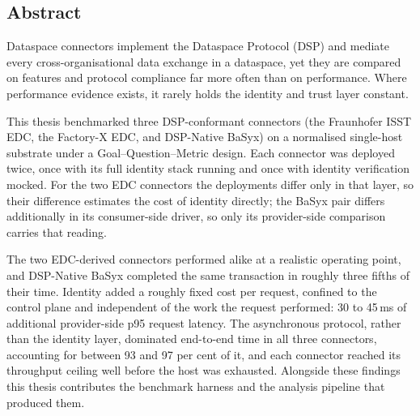 \thispagestyle{empty}

\subsection*{Abstract}

Dataspace connectors implement the Dataspace Protocol (DSP) and mediate every cross-organisational data exchange in a dataspace, yet they are compared on features and protocol compliance far more often than on performance. Where performance evidence exists, it rarely holds the identity and trust layer constant.

This thesis benchmarked three DSP-conformant connectors (the Fraunhofer ISST EDC, the Factory-X EDC, and DSP-Native BaSyx) on a normalised single-host substrate under a Goal--Question--Metric design. Each connector was deployed twice, once with its full identity stack running and once with identity verification mocked. For the two EDC connectors the deployments differ only in that layer, so their difference estimates the cost of identity directly; the BaSyx pair differs additionally in its consumer-side driver, so only its provider-side comparison carries that reading.

The two EDC-derived connectors performed alike at a realistic operating point, and DSP-Native BaSyx completed the same transaction in roughly three fifths of their time. Identity added a roughly fixed cost per request, confined to the control plane and independent of the work the request performed: 30 to 45\,ms of additional provider-side p95 request latency. The asynchronous protocol, rather than the identity layer, dominated end-to-end time in all three connectors, accounting for between 93 and 97 per cent of it, and each connector reached its throughput ceiling well before the host was exhausted. Alongside these findings this thesis contributes the benchmark harness and the analysis pipeline that produced them.

\noindent  \\
